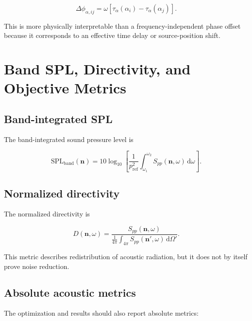 \documentclass[11pt]{article}
\newcommand{\dd}{\,\mathrm{d}}
\newcommand{\vect}[1]{\bm{#1}}
\begin{document}
\begin{equation}
    \Delta \phi_{\alpha,ij}
    =
    \omega
    \left[
        \tau_{\alpha}(\alpha_i)
        -
        \tau_{\alpha}(\alpha_j)
    \right].
\end{equation}

This is more physically interpretable than a frequency-independent phase offset because it corresponds to an effective time delay or source-position shift.

\section{Band SPL, Directivity, and Objective Metrics}

\subsection{Band-integrated SPL}

The band-integrated sound pressure level is

\begin{equation}
    \mathrm{SPL}_{\mathrm{band}}(\vect{n})
    =
    10\log_{10}
    \left[
        \frac{1}{p_{\mathrm{ref}}^2}
        \int_{\omega_1}^{\omega_2}
        S_{pp}(\vect{n},\omega)
        \dd\omega
    \right].
\end{equation}

\subsection{Normalized directivity}

The normalized directivity is

\begin{equation}
    D(\vect{n},\omega)
    =
    \frac{
        S_{pp}(\vect{n},\omega)
    }{
        \frac{1}{4\pi}
        \int_{4\pi}
        S_{pp}(\vect{n}',\omega)
        \dd\Omega'
    }.
\end{equation}

This metric describes redistribution of acoustic radiation, but it does not by itself prove noise reduction.

\subsection{Absolute acoustic metrics}

The optimization and results should also report absolute metrics:
\end{document}
